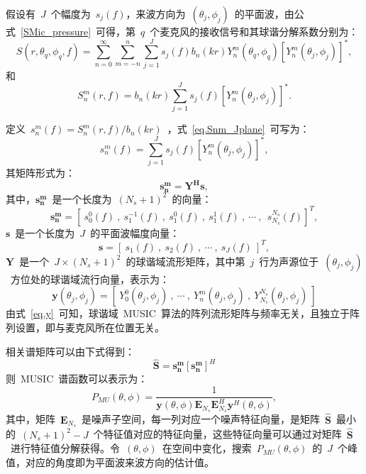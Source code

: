 假设有~$J$~个幅度为~$s_{j}(f)$，来波方向为~$(\theta_{j},\phi_{j})$~的平面波，由公式~\eqref{SMic_pressure}~可得，第~$q$~个麦克风的接收信号和其球谐分解系数分别为：
\begin{equation}
   S(r,\theta_q,\phi_q,f)=
   \sum _{n=0}^{\infty}\sum _{m=-n}^{n}\sum_{j=1}^{J} s_{j}(f) b_n(kr) Y_n ^{m}(\theta_q,\phi_q) [Y_n ^{m}(\theta_j,\phi_j)]^{*},
\end{equation}
和
\begin{equation}\label{eq.Snm_Jplane}
   S_n ^m(r,f) =
    b_n(kr) \sum_{j=1}^{J} s_{j}(f) [Y_n ^{m}(\theta_j,\phi_j)]^{*}.
\end{equation}

定义~$s_n ^m(f) = S_n ^m(r,f) / b_n(kr)$~，式~\eqref{eq.Snm_Jplane}~可写为：
\begin{equation}
   s_n^m(f) =
    \sum_{j=1}^{J} s_{j}(f) [Y_n ^{m}(\theta_j,\phi_j)]^{*},
\end{equation}
其矩阵形式为：
\begin{equation}
   \bm{s_n^m} =
    \bm{Y^{H} s},
\end{equation}
其中，$\bm{s_n^m}$~是一个长度为~$(N_{s}+1)^2$~的向量：
\begin{equation}
\bm{s_n^m} = [~s_{0}^{0}(f)~,~s_{1}^{-1}(f)~,~s_{1}^{0}(f)~,~s_{1}^{1}(f)~,~\cdots~,~~s_{N_{s}}^{N_{s}}(f)]^{T},
\end{equation}
$\bm{s}$~是一个长度为~$J$~的平面波幅度向量：
\begin{equation}
\bm{s} = [~s_{1}(f)~,~s_{2}(f)~,~\cdots~,~s_{J}(f)~]^{T},
\end{equation}
$\bm{Y}$~是一个~$J\times(N_{s}+1)^2$~的球谐域流形矩阵，其中第~$j$~行为声源位于~$(\theta_{j},\phi_{j})$~方位处的球谐域流行向量，表示为：
\begin{equation}\label{eq.y}
\mathbf{y}(\theta_{j},\phi_{j}) = [~Y_{0}^{0}(\theta_{j},\phi_{j})~,~\cdots~,~Y_{n}^{m}(\theta_{j},\phi_{j})~,~Y_{N_{s}}^{N_{s}}(\theta_{j},\phi_{j})~]
\end{equation}
由式~\eqref{eq.y}~可知，球谐域~MUSIC~算法的阵列流形矩阵与频率无关，且独立于阵列设置，即与麦克风所在位置无关。

相关谱矩阵可以由下式得到：
\begin{equation}
\hat{\mathbf{S}}=\bm{s_n^m} [\bm{s_n^m}]^{H}
\end{equation}
则~MUSIC~谱函数可以表示为：
\begin{equation}
P_{MU}(\theta,\phi)=\frac{1}{\mathbf{y}(\theta,\phi) \mathbf{E}_{N_{s}} \mathbf{E}_{N_{s}}^{H} \mathbf{y}^{H}(\theta,\phi)},
\end{equation}
其中，矩阵~$\mathbf{E}_{N_{s}}$~是噪声子空间，每一列对应一个噪声特征向量，是矩阵~$\hat{\mathbf{S}}$~最小的~$(N_{s}+1)^2-J $~个特征值对应的特征向量，这些特征向量可以通过对矩阵~$\hat{\mathbf{S}}$~进行特征值分解获得。令~$(\theta,\phi)$~在空间中变化，搜索~$P_{MU}(\theta,\phi)$~的~$J$~个峰值，对应的角度即为平面波来波方向的估计值。

